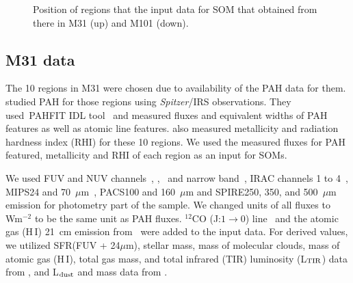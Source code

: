  \begin{figure}
    \hfill
    \caption{Position of regions that the input data for SOM that obtained from there in M31 (up) and M101 (down).}
    \label{fig:dummy}
  \end{figure}

    \subsection{M31 data}
     \label{Sec: data_M31_SOMN} 
     
     The 10 regions in M31 were chosen due to availability of the PAH data for them. 
     \cite{Dim15} studied PAH for those regions using {\it Spitzer}/IRS observations. 
     They used~{\sc PAHFIT IDL} tool~\citep{Smith07b} and measured fluxes and equivalent widths of PAH features as well as atomic line features.
     \cite{Dim15} also measured metallicity and radiation hardness index (RHI) for these 10 regions.
     We used the measured fluxes for PAH featured, metallicity and RHI of each region as an input for SOMs.
     
    We used \GALEX FUV and NUV channels~\citep{Martin05}, \halpha, \sii~and \oiii narrow band~\citep{Massey07}, IRAC channels 1 to 4~\citep{Barmby06}, MIPS24 and 70~$\mu$m~\citep{Gordon06}, PACS100 and 160~$\mu$m and SPIRE250, 350, and 500~$\mu$m~\citep{Fritz12} emission for photometry part of the sample.
     We changed units of all fluxes to Wm$^{-2}$ to be the same unit as PAH fluxes.
     $^{12}$CO (J:$1\rightarrow0$) line~\citep{Nieten06} and the atomic gas (H\,{\sc I}) 21~cm emission from~\cite{Chemin09} were added to the input data. 
     For derived values, we utilized SFR(FUV + 24$\mu$m), stellar mass, mass of molecular clouds, mass of atomic gas (H\,{\sc I}), total gas mass, and total infrared (TIR) luminosity (L$_{\rm TIR}$) data from \cite{Rahmani16}, and L$_{\rm dust}$ and mass data from \cite{Draine14}.
     
